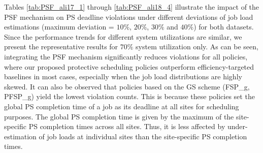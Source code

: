 \begin{table}[ht]
\centering
\caption{Number of jobs violating PS deadlines with/without PSF, 40\% deviation, 70\% utilization, Alibaba 2018}
\label{tab:PSF_ali18_4}
\end{table}


Tables \ref{tab:PSF_ali17_1} through \ref{tab:PSF_ali18_4} illustrate the impact of the PSF mechanism on PS deadline violations under different deviations of job load estimations (maximum deviation = $10\%$, $20\%$, $30\%$ and $40\%$) for both datasets. Since the performance trends for different system utilizations are similar, we present the representative results for $70\%$ system utilization only.  As can be seen, integrating the PSF mechanism significantly reduces violations for all policies, where our proposed protective scheduling policies outperform efficiency-targeted baselines in most cases, especially when the job load distributions are highly skewed. It can also be observed that policies based on the GS scheme (FSP\_g, PFSP\_g) yield the lowest violation counts. This is because these policies set the global PS completion time of a job as its deadline at all sites for scheduling purposes. The global PS completion time is given by the maximum of the site-specific PS completion times across all sites. Thus, it is less affected by under-estimation of job loads at individual sites than the site-specific PS completion times. %



